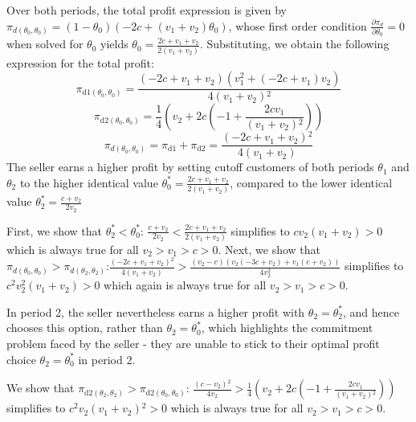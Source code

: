 \documentclass[isre,blindrev]{informs3} %
\begin{document}
Over both periods, the total profit expression is given by { }\(\pi _{d\left(\theta _0,\theta _0\right)}=\left(1-\theta _0\right) \left(-2 c+\left(v_1+v_2\right)
\theta _0\right)\), whose first order condition \(\frac{\partial \pi _d}{\partial \theta _0}=0\) when solved for \(\theta _0\) yields \(\theta _0=\frac{2
c+v_1+v_2}{2 \left(v_1+v_2\right)}\). Substituting, we obtain the following expression for the total profit:
\begin{equation}
\pi _{\text{d1}\left(\theta _0,\theta _0\right)}=\frac{\left(-2 c+v_1+v_2\right) \left(v_1^2+\left(-2 c+v_1\right) v_2\right)}{4 \left(v_1+v_2\right){}^2}
\end{equation}
\begin{equation}
\pi _{\text{d2}\left(\theta _0,\theta _0\right)}=\frac{1}{4} \left(v_2+2 c \left(-1+\frac{2 c v_1}{\left(v_1+v_2\right){}^2}\right)\right)
\end{equation}
\begin{equation}
\pi _{d\left(\theta _0,\theta _0\right)}=\pi _{\text{d1}}+\pi _{\text{d2}}=\frac{\left(-2 c+v_1+v_2\right){}^2}{4 \left(v_1+v_2\right)}
\end{equation}
The seller earns a higher profit by setting cutoff customers of both periods \(\theta _1\) and \(\theta _2\) to the higher identical value \(\theta
_0^*=\frac{2 c+v_1+v_2}{2 \left(v_1+v_2\right)}\), compared to the lower identical value \(\theta _2^*=\frac{c+v_2}{2 v_2}\)

First, we show that \(\theta _2^*<\theta _0^*\): \(\frac{c+v_2}{2 v_2}<\frac{2 c+v_1+v_2}{2 \left(v_1+v_2\right)}\) simplifies to \(c
v_2 \left(v_1+v_2\right)>0\) which is always true for all \(v_2>v_1>c>0\). Next, we show that \(\pi _{d\left(\theta _0,\theta _0\right)}>\pi _{d\left(\theta
_2,\theta _2\right)}\):\(\frac{\left(-2 c+v_1+v_2\right){}^2}{4 \left(v_1+v_2\right)}>\frac{\left(v_2-c\right) \left(v_2 \left(-3 c+v_2\right)+v_1
\left(c+v_2\right)\right)}{4 v_2^2}\) simplifies to \(c^2 v_2^2 \left(v_1+v_2\right)>0\) which again is always true for all \(v_2>v_1>c>0\).

In period 2, the seller nevertheless earns a higher profit with \(\theta _2=\theta _2^*\), and hence chooses this option, rather than \(\theta _2=\theta
_0^*\), which highlights the commitment problem faced by the seller - they are unable to stick to their optimal profit choice \(\theta _2=\theta
_0^*\) in period 2. 

We show that \(\pi _{\text{d2}\left(\theta _2,\theta _2\right)}>\pi _{\text{d2}\left(\theta _0,\theta _0\right)}\): \(\frac{\left(c-v_2\right){}^2}{4
v_2}>\frac{1}{4} \left(v_2+2 c \left(-1+\frac{2 c v_1}{\left(v_1+v_2\right){}^2}\right)\right)\) simplifies to \(c^2 v_2 \left(v_1+v_2\right){}^2>0\)
which is always true for all \(v_2>v_1>c>0\). 
\qedsymbol
\end{document}
